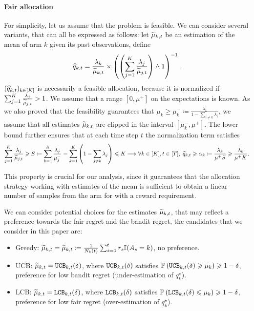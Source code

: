 \paragraph{Fair allocation} For simplicity, let us assume that the problem is feasible. We can consider several variants, that can all be expressed as follows: let $\widetilde{\mu}_{k,t}$ be an estimation of the mean of arm $k$ given its past observations, define \[ \widehat{q}_{k,t}= \frac{\lambda_k}{\widetilde{\mu}_{k, t}} \times \left(\left(\sum_{j=1}^K \frac{\lambda_j}{\widetilde{\mu}_{j, t}}\right) \wedge 1\right)^{-1}.\] 
$(\widehat{q}_{k, t})_{k \in [K]}$ is necessarily a feasible allocation, because it is normalized if $\sum_{j=1}^K \frac{\lambda_j}{\widetilde{\mu}_{j, t}}> 1$. We assume that a range $[0, \mu^+]$ on the expectations is known. As we also proved that the feasibility guarantees that $\mu_k \geq \mu_k^- \coloneqq \frac{\lambda_k}{1-\sum_{i\neq k}\lambda_i}$, we assume that all estimates $\widetilde{\mu}_{k,t}$ are clipped in the interval $[\mu_k^-, \mu^+]$. The lower bound further ensures that at each time step $t$ the normalization term satisfies \[\sum_{j=1}^K \frac{\lambda_j}{\widetilde{\mu}_{j, t}}\geqslant S \coloneqq \sum_{k=1}^K \frac{\lambda_j}{\mu_j^-}=\sum_{k=1}^K \left(1-\sum_{j\neq k} \lambda_j\right) \leqslant K \Longrightarrow \forall k\in[K], t\in[T], \; \widehat{q}_{k, t}\geqslant \alpha_k \coloneqq \frac{\lambda_k}{\mu^+ S}\geqslant \frac{\lambda_k}{\mu^+ K}.\] 

This property is crucial for our analysis, since it guarantees that the allocation strategy working with estimates of the mean is sufficient to obtain a linear number of samples from the arm for with a reward requirement. 


We can consider potential choices for the estimates $\widetilde{\mu}_{k,t}$, that may reflect a preference towards the fair regret and the bandit regret, the candidates that we consider in this paper are:
\begin{itemize}
	\item Greedy: $\widetilde{\mu}_{k, t} = \widehat{\mu}_{k, t} \coloneqq \frac{1}{N_k(t)}\sum_{s=1}^t r_s\mathbb{I}(A_s=k)$, no preference.
	\item UCB: $\widetilde{\mu}_{k, t} = \texttt{UCB}_{k, t}(\delta)$, where $\texttt{UCB}_{k, t}(\delta)$ satisfies $\mathbb{P}\left(\texttt{UCB}_{k, t}(\delta) \geqslant \mu_k\right) \geqslant 1-\delta$, preference for low bandit regret (under-estimation of $q_k^\star$).
	\item LCB: $\widetilde{\mu}_{k, t} = \texttt{LCB}_{k, t}(\delta)$, where $\texttt{LCB}_{k, t}(\delta)$ satisfies $\mathbb{P}\left(\texttt{LCB}_{k, t}(\delta) \leqslant \mu_k\right) \geqslant 1-\delta$, preference for low fair regret (over-estimation of $q_k^\star$).
\end{itemize}

